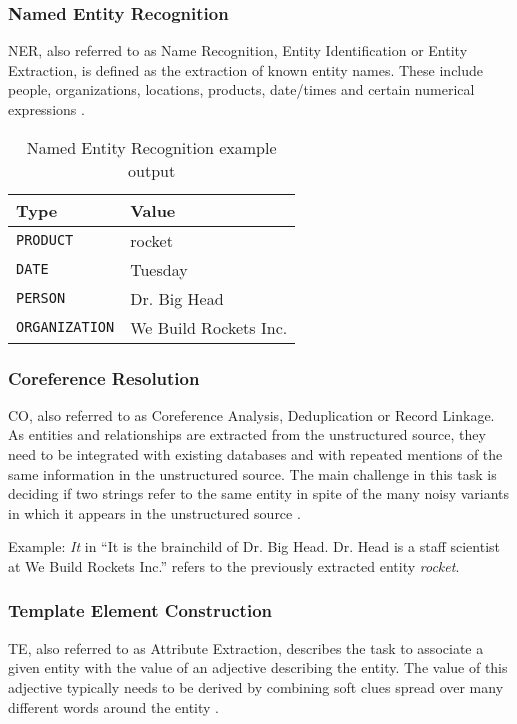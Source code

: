 \subsubsection{Named Entity Recognition}
\gls{NER}, also referred to as Name Recognition, Entity Identification or Entity Extraction, is defined as the extraction of known entity names. These include people, organizations, locations, products, date/times and certain numerical expressions \cite{Linsmayr:2010}. 

\begin{table}[H]
\centering
\begin{tabular*}{\textwidth}{ l  l }
	\toprule
	\textbf{Type} & \textbf{Value} \\
	\midrule
	\texttt{PRODUCT} & rocket \\
	\texttt{DATE} & Tuesday \\
	\texttt{PERSON} & Dr. Big Head \\
	\texttt{ORGANIZATION} & We Build Rockets Inc. \\
	\bottomrule
\end{tabular*}
\caption{Named Entity Recognition example output}
\end{table}

\subsubsection{Coreference Resolution}
\gls{CO}, also referred to as Coreference Analysis, Deduplication or Record Linkage. As entities and relationships are extracted from the unstructured source, they need to be integrated with existing databases and with repeated mentions of the same information in the unstructured source. The main challenge in this task is deciding if two strings refer to the same entity in spite of the many noisy variants in which it appears in the unstructured source \cite{Sarawagi:2008}.

Example: \textit{It} in \enquote{It is the brainchild of Dr. Big Head. Dr. Head is a staff scientist at We Build Rockets Inc.} refers to the previously extracted entity \textit{rocket}.

\subsubsection{Template Element Construction}
\gls{TE}, also referred to as Attribute Extraction, describes the task to associate a given entity with the value of an adjective describing the entity. The value of this adjective typically needs to be derived by combining soft clues spread over many different words around the entity
 \cite{Sarawagi:2008}.

